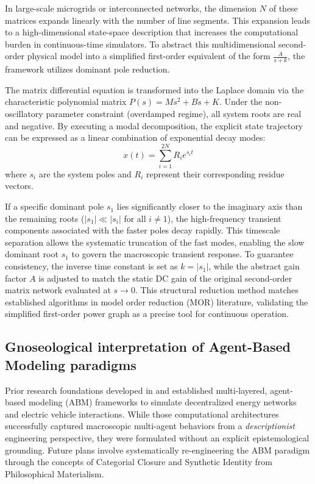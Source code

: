 \documentclass[11pt, a4paper]{article}
\begin{document}
In large-scale microgrids or interconnected networks, the dimension $N$ of these matrices expands linearly with the number of line segments. This expansion leads to a high-dimensional state-space description that increases the computational burden in continuous-time simulators. To abstract this multidimensional second-order physical model into a simplified first-order equivalent of the form $\frac{A}{s+k}$, the framework utilizes dominant pole reduction.

The matrix differential equation is transformed into the Laplace domain via the characteristic polynomial matrix $P(s) = M s^2 + B s + K$. Under the non-oscillatory parameter constraint (overdamped regime), all system roots are real and negative. By executing a modal decomposition, the explicit state trajectory can be expressed as a linear combination of exponential decay modes:
\begin{equation}
    x(t) = \sum_{i=1}^{2N} R_i e^{s_i t}
\end{equation}
where $s_i$ are the system poles and $R_i$ represent their corresponding residue vectors.

If a specific dominant pole $s_1$ lies significantly closer to the imaginary axis than the remaining roots ($|s_1| \ll |s_i|$ for all $i \neq 1$), the high-frequency transient components associated with the faster poles decay rapidly. This timescale separation allows the systematic truncation of the fast modes, enabling the slow dominant root $s_1$ to govern the macroscopic transient response. To guarantee consistency, the inverse time constant is set as $k = |s_1|$, while the abstract gain factor $A$ is adjusted to match the static DC gain of the original second-order matrix network evaluated at $s \to 0$. This structural reduction method matches established algorithms in model order reduction (MOR) literature, validating the simplified first-order power graph as a precise tool for continuous operation.




\subsection{Gnoseological interpretation of Agent-Based Modeling paradigms}
Prior research foundations developed in \cite{durana2014agent} and \cite{durana2015agent} established multi-layered, agent-based modeling (ABM) frameworks to simulate decentralized energy networks and electric vehicle interactions. While those computational architectures successfully captured macroscopic multi-agent behaviors from a \textit{descriptionist} engineering perspective, they were formulated without an explicit epistemological grounding. Future plans involve systematically re-engineering the ABM paradigm through the concepts of Categorial Closure and Synthetic Identity from Philosophical Materialism.
\end{document}
